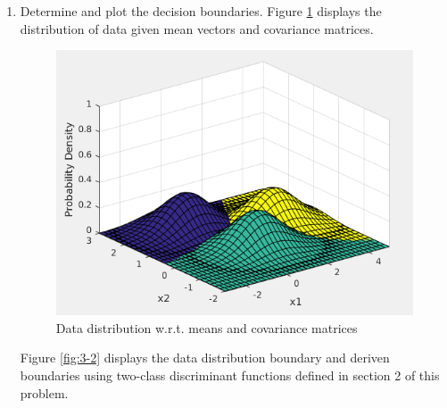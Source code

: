 \documentclass[12pt]{article}
\begin{document}
\begin{enumerate}
\item Determine and plot the decision boundaries.
Figure \ref{fig:3-1} displays the distribution of data given mean vectors and covariance matrices.
\begin{figure}[h]
\centering
\includegraphics[scale=0.5]{Imgs/3-1.png}
\caption{Data distribution w.r.t. means and covariance matrices}
\label{fig:3-1}
\end{figure}

Figure \ref{fig:3-2} displays the data distribution boundary and deriven boundaries using two-class discriminant functions defined in section 2 of this problem.



\end{enumerate}
\end{document}
